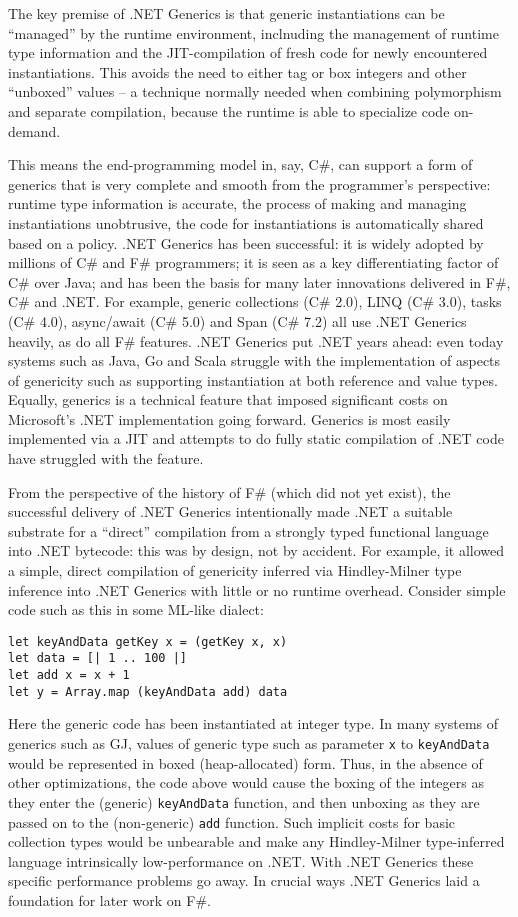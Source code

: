 \documentclass[acmsmall,review]{acmart}\settopmatter{printfolios=true,printccs=false,printacmref=false}
\begin{document}
The key premise of .NET Generics is that generic instantiations can be “managed” by the runtime environment, inclnuding the management of runtime type information and the JIT-compilation of fresh code for newly encountered instantiations.  This avoids the need to either tag or box integers and other “unboxed” values – a technique normally needed when combining polymorphism and separate compilation, because the runtime is able to specialize code on-demand.

This means the end-programming model in, say, C\#, can support a form of generics that is very complete and smooth from the programmer’s perspective: runtime type information is accurate, the process of making and managing instantiations unobtrusive, the code for instantiations is automatically shared based on a policy. .NET Generics has been successful: it is widely adopted by millions of C\# and F\# programmers; it is seen as a key differentiating factor of C\# over Java; and has been the basis for many later innovations delivered in F\#, C\# and .NET. For example, generic collections (C\# 2.0), LINQ (C\# 3.0), tasks (C\# 4.0), async/await (C\# 5.0) and Span (C\# 7.2) all use .NET Generics heavily, as do all F\# features. .NET Generics put .NET years ahead: even today systems such as Java, Go and Scala struggle with the implementation of aspects of genericity such as supporting instantiation at both reference and value types.  Equally, generics is a technical feature that imposed significant costs on Microsoft’s .NET implementation going forward. Generics is most easily implemented via a JIT and attempts to do fully static compilation of .NET code have struggled with the feature.


From the perspective of the history of F\# (which did not yet exist), the successful delivery of .NET Generics intentionally made .NET a suitable substrate for a “direct” compilation from a strongly typed functional language into .NET bytecode: this was by design, not by accident. For example, it allowed a simple, direct compilation of genericity inferred via Hindley-Milner type inference into .NET Generics with little or no runtime overhead.  Consider simple code such as this in some ML-like dialect:
\begin{verbatim}
let keyAndData getKey x = (getKey x, x)
let data = [| 1 .. 100 |]
let add x = x + 1
let y = Array.map (keyAndData add) data
\end{verbatim}

Here the generic code has been instantiated at integer type. In many systems of generics such as GJ, values of generic type such as parameter \texttt{x} to \texttt{keyAndData} would be represented in boxed (heap-allocated) form.  Thus, in the absence of other optimizations, the code above would cause the boxing of the integers as they enter the (generic) \texttt{keyAndData} function, and then unboxing as they are passed on to the (non-generic) \texttt{add} function.  Such implicit costs for basic collection types would be unbearable and make any Hindley-Milner type-inferred language intrinsically low-performance on .NET. With .NET Generics these specific performance problems go away.  In crucial ways .NET Generics laid a foundation for later work on F\#.
\end{document}
